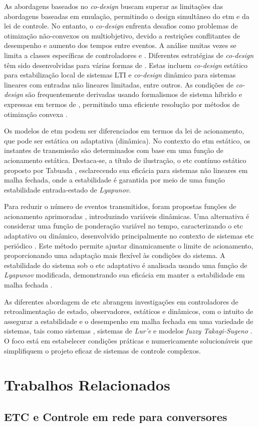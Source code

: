 As abordagens baseados no \textit{co-design} buscam superar as limitações das abordagens baseadas em emulação, permitindo o design simultâneo do \acrshort{etm} e da lei de controle. No entanto, o \textit{co-design} enfrenta desafios como problemas de otimização não-convexos ou multiobjetivo, devido a restrições conflitantes de desempenho e aumento dos tempos entre eventos. A análise muitas vezes se limita a classes específicas de controladores e  \cite{coutinho2021}. Diferentes estratégias de \textit{co-design} têm sido desenvolvidas para várias formas de . Estas incluem \textit{co-design} estático para estabilização local de sistemas LTI e \textit{co-design} dinâmico para sistemas lineares com entradas não lineares limitadas, entre outros. As condições de \textit{co-design} são frequentemente derivadas usando formalismos de sistema híbrido e expressas em termos de , permitindo uma eficiente resolução por métodos de otimização convexa \cite{coutinho2021}.


Os modelos de \acrshort{etm} podem ser diferenciados em termos da lei de acionamento, que pode ser estática ou adaptativa (dinâmica). No contexto do \acrshort{etm} estático, os instantes de transmissão são determinados com base em uma função de acionamento estática. Destaca-se, a título de ilustração, o \acrshort{etc} contínuo estático proposto por Tabuada \cite{Tabuada2007}, esclarecendo sua eficácia para sistemas não lineares em malha fechada, onde a estabilidade é garantida por meio de uma função estabilidade entrada-estado de \textit{Lyapunov}.

Para reduzir o número de eventos transmitidos, foram propostas funções de acionamento aprimoradas \cite{Wang2020,Zong2023,Ge2017, Ning2018, Wu2021}, introduzindo variáveis dinâmicas. Uma alternativa é considerar uma função de ponderação variável no tempo, caracterizando o \acrshort{etc} adaptativo ou dinâmico, desenvolvido principalmente no contexto de sistemas \acrshort{etc} periódico \cite{coutinho2021}. Este método permite ajustar dinamicamente o limite de acionamento, proporcionando uma adaptação mais flexível às condições do sistema. A estabilidade do sistema sob o \acrshort{etc} adaptativo é analisada usando uma função de \textit{Lyapunov} modificada, demonstrando sua eficácia em manter a estabilidade em malha fechada \cite{coutinho2021}.

As diferentes abordagem de \acrshort{etc} abrangem investigações em controladores de retroalimentação de estado, observadores,  estáticos e dinâmicos, com o intuito de assegurar a estabilidade e o desempenho em malha fechada em uma variedade de sistemas, tais como sistemas  \cite{Zong2023,Wu2021}, sistemas de \textit{Lur'e} \cite{Zhang2017} e modelos \textit{fuzzy Takagi-Sugeno} \cite{Pan2017}. O foco está em estabelecer condições práticas e numericamente solucionáveis que simplifiquem o projeto eficaz de sistemas de controle complexos.

\section{Trabalhos Relacionados}
\subsection{ETC e Controle em rede para conversores}